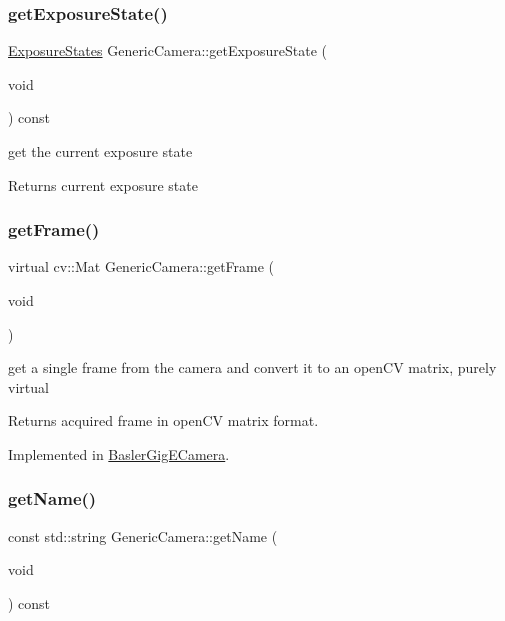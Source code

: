 \subsubsection{\texorpdfstring{get\+Exposure\+State()}{getExposureState()}}
{\footnotesize\ttfamily \hyperlink{constants_8h_ae9749bac8d6973b92725af092d0a76bc}{Exposure\+States} Generic\+Camera\+::get\+Exposure\+State (\begin{DoxyParamCaption}\item[{void}]{ }\end{DoxyParamCaption}) const\hspace{0.3cm}{\ttfamily [inline]}}

get the current exposure state \begin{DoxyReturn}{Returns}
current exposure state 
\end{DoxyReturn}
\mbox{\label{class_generic_camera_abeaa74ba34179da70ec2c4bbb9b0d793}} 
\subsubsection{\texorpdfstring{get\+Frame()}{getFrame()}}
{\footnotesize\ttfamily virtual cv\+::\+Mat Generic\+Camera\+::get\+Frame (\begin{DoxyParamCaption}\item[{void}]{ }\end{DoxyParamCaption})\hspace{0.3cm}{\ttfamily [pure virtual]}}

get a single frame from the camera and convert it to an open\+CV matrix, purely virtual \begin{DoxyReturn}{Returns}
acquired frame in open\+CV matrix format. 
\end{DoxyReturn}


Implemented in \hyperlink{class_basler_gig_e_camera_a8e2789aa27a9b0a8075457223afa415e}{Basler\+Gig\+E\+Camera}.

\mbox{\label{class_generic_camera_a7f97060cc4089fb4d8834ce8c055a561}} 
\subsubsection{\texorpdfstring{get\+Name()}{getName()}}
{\footnotesize\ttfamily const std\+::string Generic\+Camera\+::get\+Name (\begin{DoxyParamCaption}\item[{void}]{ }\end{DoxyParamCaption}) const\hspace{0.3cm}{\ttfamily [inline]}}

